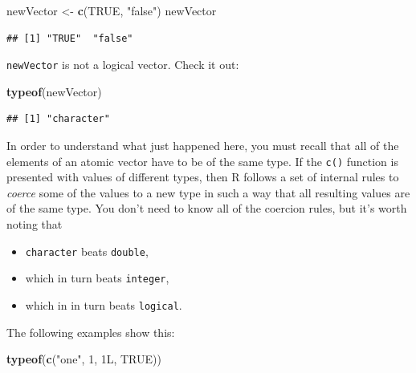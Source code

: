 \documentclass[]{book}
\makeatletter
\newenvironment{Shaded}{\begin{snugshade}}{\end{snugshade}}
\newcommand{\KeywordTok}[1]{\textcolor[rgb]{0.13,0.29,0.53}{\textbf{{#1}}}}
\newcommand{\DecValTok}[1]{\textcolor[rgb]{0.00,0.00,0.81}{{#1}}}
\newcommand{\StringTok}[1]{\textcolor[rgb]{0.31,0.60,0.02}{{#1}}}
\newcommand{\OtherTok}[1]{\textcolor[rgb]{0.56,0.35,0.01}{{#1}}}
\newcommand{\NormalTok}[1]{{#1}}
\providecommand{\tightlist}{%
  \setlength{\itemsep}{0pt}\setlength{\parskip}{0pt}}
\newenvironment{kframe}{%
\medskip{}
\setlength{\fboxsep}{.8em}
 \def\at@end@of@kframe{}%
 \ifinner\ifhmode%
  \def\at@end@of@kframe{\end{minipage}}%
  \begin{minipage}{\columnwidth}%
 \fi\fi%
 \def\FrameCommand##1{\hskip\@totalleftmargin \hskip-\fboxsep
 \colorbox{shadecolor}{##1}\hskip-\fboxsep
     \hskip-\linewidth \hskip-\@totalleftmargin \hskip\columnwidth}%
 \MakeFramed {\advance\hsize-\width
   \@totalleftmargin\z@ \linewidth\hsize
   \@setminipage}}%
 {\par\unskip\endMakeFramed%
 \at@end@of@kframe}
\renewenvironment{Shaded}{\begin{kframe}}{\end{kframe}}
\theoremstyle{definition}
\theoremstyle{definition}
\theoremstyle{remark}
\makeatother
\begin{document}
\begin{Shaded}
\begin{Highlighting}[]
\NormalTok{newVector <-}\StringTok{ }\KeywordTok{c}\NormalTok{(}\OtherTok{TRUE}\NormalTok{, }\StringTok{"false"}\NormalTok{)}
\NormalTok{newVector}
\end{Highlighting}
\end{Shaded}

\begin{verbatim}
## [1] "TRUE"  "false"
\end{verbatim}

\texttt{newVector} is not a logical vector. Check it out:

\begin{Shaded}
\begin{Highlighting}[]
\KeywordTok{typeof}\NormalTok{(newVector)}
\end{Highlighting}
\end{Shaded}

\begin{verbatim}
## [1] "character"
\end{verbatim}

In order to understand what just happened here, you must recall that all
of the elements of an atomic vector have to be of the same type. If the
\texttt{c()} function is presented with values of different types, then
R follows a set of internal rules to \emph{coerce} some
of the values to a new type in such a way that all resulting values are
of the same type. You don't need to know all of the coercion rules, but
it's worth noting that

\begin{itemize}
\tightlist
\item
  \texttt{character} beats \texttt{double},
\item
  which in turn beats \texttt{integer},
\item
  which in in turn beats \texttt{logical}.
\end{itemize}

The following examples show this:

\begin{Shaded}
\begin{Highlighting}[]
\KeywordTok{typeof}\NormalTok{(}\KeywordTok{c}\NormalTok{(}\StringTok{"one"}\NormalTok{, }\DecValTok{1}\NormalTok{, 1L, }\OtherTok{TRUE}\NormalTok{))}
\end{Highlighting}
\end{Shaded}
\end{document}

